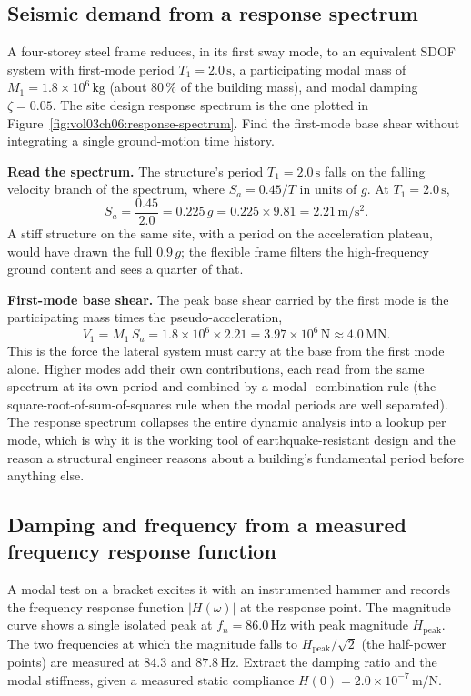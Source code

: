\subsection{Seismic demand from a response spectrum}

A four-storey steel frame reduces, in its first sway mode, to an
equivalent SDOF system with first-mode period $T_1 = 2.0\,\si{\second}$,
a participating modal mass of $M_1 = 1.8\times 10^6\,\si{\kilogram}$
(about $80\,\%$ of the building mass), and modal damping
$\zeta = 0.05$. The site design response spectrum is the one plotted in
Figure~\ref{fig:vol03ch06:response-spectrum}. Find the first-mode base
shear without integrating a single ground-motion time history.



\textbf{Read the spectrum.} The structure's period $T_1 = 2.0\,\si{
\second}$ falls on the falling velocity branch of the spectrum, where
$S_a = 0.45/T$ in units of $g$. At $T_1 = 2.0\,\si{\second}$,
\[
S_a = \frac{0.45}{2.0} = 0.225\,g = 0.225\times 9.81 = 2.21\,\si{\meter
\per\second\squared}.
\]
A stiff structure on the same site, with a period on the acceleration
plateau, would have drawn the full $0.9\,g$; the flexible frame filters
the high-frequency ground content and sees a quarter of that.

\textbf{First-mode base shear.} The peak base shear carried by the
first mode is the participating mass times the pseudo-acceleration,
\[
V_1 = M_1\,S_a = 1.8\times 10^6\times 2.21 = 3.97\times 10^6\,\text{N}
\approx 4.0\,\text{MN}.
\]
This is the force the lateral system must carry at the base from the
first mode alone. Higher modes add their own contributions, each read
from the same spectrum at its own period and combined by a modal-
combination rule (the square-root-of-sum-of-squares rule when the modal
periods are well separated). The response spectrum collapses the entire
dynamic analysis into a lookup per mode, which is why it is the
working tool of earthquake-resistant design and the reason a structural
engineer reasons about a building's fundamental period before anything
else.

\subsection{Damping and frequency from a measured frequency response
function}

A modal test on a bracket excites it with an instrumented hammer and
records the frequency response function $|H(\omega)|$ at the response
point. The magnitude curve shows a single isolated peak at
$f_n = 86.0\,\si{\hertz}$ with peak magnitude $H_{\text{peak}}$. The two
frequencies at which the magnitude falls to $H_{\text{peak}}/\sqrt2$ (the
half-power points) are measured at $84.3$ and $87.8\,\si{\hertz}$.
Extract the damping ratio and the modal stiffness, given a measured
static compliance $H(0) = 2.0\times 10^{-7}\,\si{\meter\per\newton}$.

